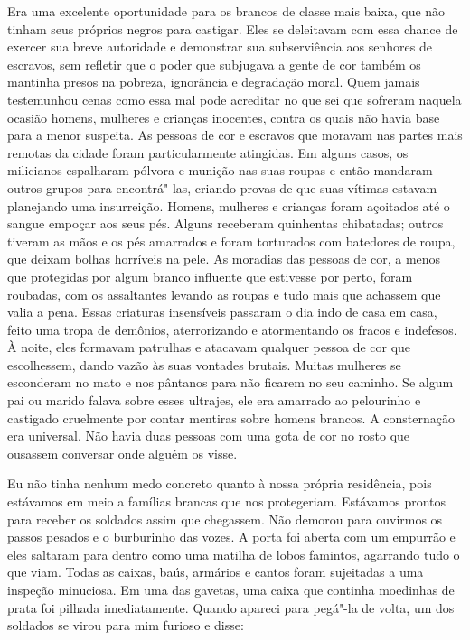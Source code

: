 Era uma excelente oportunidade para os
brancos de classe mais baixa, que não tinham seus próprios negros para
castigar. Eles se deleitavam com essa chance de exercer sua breve
autoridade e demonstrar sua subserviência aos senhores de escravos, sem
refletir que o poder que subjugava a gente de cor também os mantinha
presos na pobreza, ignorância e degradação moral. Quem jamais
testemunhou cenas como essa mal pode acreditar no que sei que sofreram
naquela ocasião homens, mulheres e crianças inocentes, contra os quais
não havia base para a menor suspeita. As pessoas de cor e escravos que
moravam nas partes mais remotas da cidade foram particularmente
atingidas. Em alguns casos, os milicianos espalharam pólvora e munição
nas suas roupas e então mandaram outros grupos para encontrá"-las,
criando provas de que suas vítimas estavam planejando uma insurreição.
Homens, mulheres e crianças foram açoitados até o sangue empoçar aos
seus pés. Alguns receberam quinhentas chibatadas; outros tiveram as mãos
e os pés amarrados e foram torturados com batedores de roupa, que deixam
bolhas horríveis na pele. As moradias das pessoas de cor, a menos que
protegidas por algum branco influente que estivesse por perto, foram
roubadas, com os assaltantes levando as roupas e tudo mais que achassem
que valia a pena. Essas criaturas insensíveis passaram o dia indo de
casa em casa, feito uma tropa de demônios, aterrorizando e atormentando
os fracos e indefesos. À noite, eles formavam patrulhas e atacavam
qualquer pessoa de cor que escolhessem, dando vazão às suas vontades
brutais. Muitas mulheres se esconderam no mato e nos pântanos para não
ficarem no seu caminho. Se algum pai ou marido falava sobre esses
ultrajes, ele era amarrado ao pelourinho e castigado cruelmente por
contar mentiras sobre homens brancos. A consternação era universal. Não
havia duas pessoas com uma gota de cor no rosto que ousassem conversar
onde alguém os visse.

Eu não tinha nenhum medo concreto
quanto à nossa própria residência, pois estávamos em meio a famílias
brancas que nos protegeriam. Estávamos prontos para receber os soldados
assim que chegassem. Não demorou para ouvirmos os passos pesados e o
burburinho das vozes. A porta foi aberta com um empurrão e eles saltaram
para dentro como uma matilha de lobos famintos, agarrando tudo o que
viam. Todas as caixas, baús, armários e cantos foram sujeitadas a uma
inspeção minuciosa. Em uma das gavetas, uma caixa que continha moedinhas
de prata foi pilhada imediatamente. Quando apareci para pegá"-la de
volta, um dos soldados se virou para mim furioso e disse:

